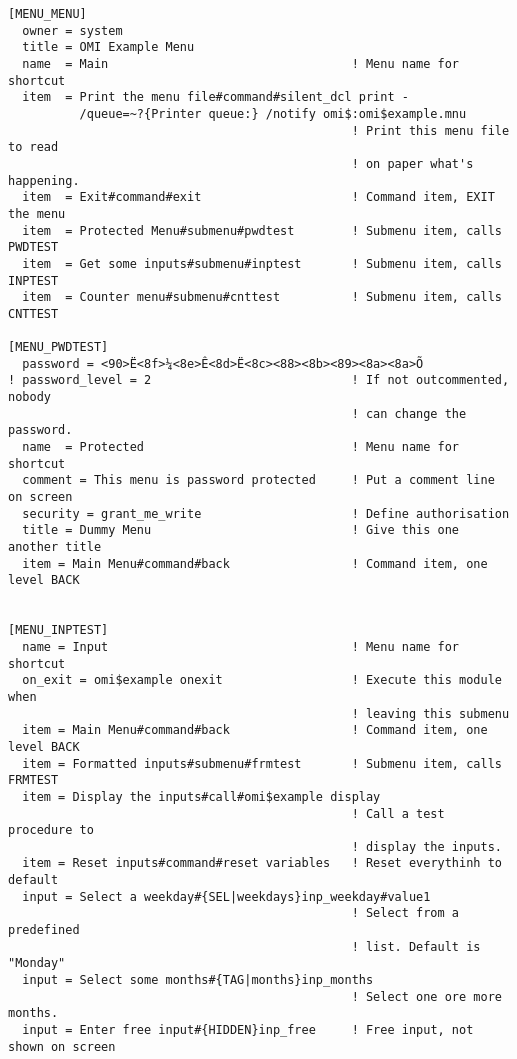 \documentclass[a4paper]{book}
\begin{document}
\begin{verbatim}
[MENU_MENU]
  owner = system
  title = OMI Example Menu
  name  = Main                                  ! Menu name for shortcut
  item  = Print the menu file#command#silent_dcl print -
          /queue=~?{Printer queue:} /notify omi$:omi$example.mnu
                                                ! Print this menu file to read
                                                ! on paper what's happening.
  item  = Exit#command#exit                     ! Command item, EXIT the menu
  item  = Protected Menu#submenu#pwdtest        ! Submenu item, calls PWDTEST
  item  = Get some inputs#submenu#inptest       ! Submenu item, calls INPTEST
  item  = Counter menu#submenu#cnttest          ! Submenu item, calls CNTTEST

[MENU_PWDTEST]
  password = <90>Ë<8f>¼<8e>Ê<8d>Ë<8c><88><8b><89><8a><8a>Õ
! password_level = 2                            ! If not outcommented, nobody
                                                ! can change the password.
  name  = Protected                             ! Menu name for shortcut
  comment = This menu is password protected     ! Put a comment line on screen
  security = grant_me_write                     ! Define authorisation
  title = Dummy Menu                            ! Give this one another title
  item = Main Menu#command#back                 ! Command item, one level BACK


[MENU_INPTEST]
  name = Input                                  ! Menu name for shortcut
  on_exit = omi$example onexit                  ! Execute this module when
                                                ! leaving this submenu
  item = Main Menu#command#back                 ! Command item, one level BACK
  item = Formatted inputs#submenu#frmtest       ! Submenu item, calls FRMTEST
  item = Display the inputs#call#omi$example display
                                                ! Call a test procedure to
                                                ! display the inputs.
  item = Reset inputs#command#reset variables   ! Reset everythinh to default
  input = Select a weekday#{SEL|weekdays}inp_weekday#value1
                                                ! Select from a predefined
                                                ! list. Default is "Monday"
  input = Select some months#{TAG|months}inp_months
                                                ! Select one ore more months.
  input = Enter free input#{HIDDEN}inp_free     ! Free input, not shown on screen


\end{verbatim}
\end{document}
